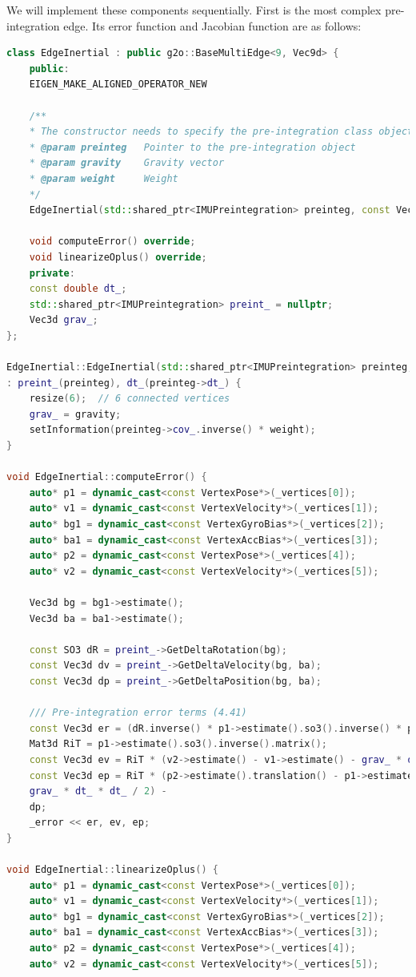 We will implement these components sequentially. First is the most complex pre-integration edge. Its error function and Jacobian function are as follows:
\begin{lstlisting}[language=c++,caption=src/ch4/g2o\_types.cc]
class EdgeInertial : public g2o::BaseMultiEdge<9, Vec9d> {
	public:
	EIGEN_MAKE_ALIGNED_OPERATOR_NEW
	
	/**
	* The constructor needs to specify the pre-integration class object
	* @param preinteg   Pointer to the pre-integration object
	* @param gravity    Gravity vector
	* @param weight     Weight
	*/
	EdgeInertial(std::shared_ptr<IMUPreintegration> preinteg, const Vec3d& gravity, double weight = 1.0);
	
	void computeError() override;
	void linearizeOplus() override;
	private:
	const double dt_;
	std::shared_ptr<IMUPreintegration> preint_ = nullptr;
	Vec3d grav_;
};

EdgeInertial::EdgeInertial(std::shared_ptr<IMUPreintegration> preinteg, const Vec3d& gravity, double weight)
: preint_(preinteg), dt_(preinteg->dt_) {
	resize(6);  // 6 connected vertices
	grav_ = gravity;
	setInformation(preinteg->cov_.inverse() * weight);
}

void EdgeInertial::computeError() {
	auto* p1 = dynamic_cast<const VertexPose*>(_vertices[0]);
	auto* v1 = dynamic_cast<const VertexVelocity*>(_vertices[1]);
	auto* bg1 = dynamic_cast<const VertexGyroBias*>(_vertices[2]);
	auto* ba1 = dynamic_cast<const VertexAccBias*>(_vertices[3]);
	auto* p2 = dynamic_cast<const VertexPose*>(_vertices[4]);
	auto* v2 = dynamic_cast<const VertexVelocity*>(_vertices[5]);
	
	Vec3d bg = bg1->estimate();
	Vec3d ba = ba1->estimate();
	
	const SO3 dR = preint_->GetDeltaRotation(bg);
	const Vec3d dv = preint_->GetDeltaVelocity(bg, ba);
	const Vec3d dp = preint_->GetDeltaPosition(bg, ba);
	
	/// Pre-integration error terms (4.41)
	const Vec3d er = (dR.inverse() * p1->estimate().so3().inverse() * p2->estimate().so3()).log();
	Mat3d RiT = p1->estimate().so3().inverse().matrix();
	const Vec3d ev = RiT * (v2->estimate() - v1->estimate() - grav_ * dt_) - dv;
	const Vec3d ep = RiT * (p2->estimate().translation() - p1->estimate().translation() - v1->estimate() * dt_ -
	grav_ * dt_ * dt_ / 2) -
	dp;
	_error << er, ev, ep;
}

void EdgeInertial::linearizeOplus() {
	auto* p1 = dynamic_cast<const VertexPose*>(_vertices[0]);
	auto* v1 = dynamic_cast<const VertexVelocity*>(_vertices[1]);
	auto* bg1 = dynamic_cast<const VertexGyroBias*>(_vertices[2]);
	auto* ba1 = dynamic_cast<const VertexAccBias*>(_vertices[3]);
	auto* p2 = dynamic_cast<const VertexPose*>(_vertices[4]);
	auto* v2 = dynamic_cast<const VertexVelocity*>(_vertices[5]);
	

\end{lstlisting}
